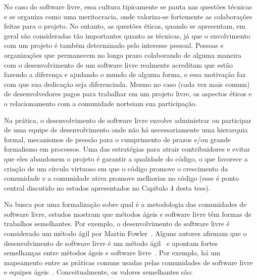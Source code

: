 No caso do software livre, essa cultura tipicamente se pauta nas
questões técnicas e se organiza como uma meritocracia, onde
valoriza-se fortemente as colaborações feitas para o projeto.
%
No entanto, as questões éticas, quando se apresentam, em geral são consideradas
tão importantes quanto as técnicas, já que o envolvimento com um projeto é
também determinado pelo interesse pessoal.
%
Pessoas e organizações que permanecem no longo prazo colaborando de alguma maneira com o
desenvolvimento de um software livre realmente acreditam que estão fazendo a 
diferença e ajudando o mundo de alguma forma, e essa motivação
faz com que sua dedicação seja diferenciada.
%
Mesmo no caso (cada vez mais comum) de desenvolvedores pagos para trabalhar em um projeto
livre, os aspectos éticos e o relacionamento com a comunidade
norteiam sua participação.

\begin{comment}
Acho que voce deveria incluir exemplos ilustrativos para todos os pontos que argumenta (e.g., "Pessoas e organizações que permanecem no longo prazo colaborando de alguma maneira com o desenvolvimento de um software livre realmente acreditam que estão fazendo a diferença e ajudando
o mundo de alguma forma"; "colaboram com um software livre para melhor reaproveitar o conhecimento produzido coletivamente, bem como atingir numa escala maior seu mercado consumidor"; "muitos projetos de software livre não vão além dos estágios iniciais de planejamento"; etc. etc.).
\end{comment}

Na prática, o desenvolvimento de software livre envolve administrar ou participar
de uma equipe de desenvolvimento onde não há necessariamente uma hierarquia formal,
mecanismos de pressão para o cumprimento de prazos e/ou grande formalismo em processos.
%
Uma das estratégias para atrair contribuidores e evitar que eles abandonem o
projeto é garantir a qualidade do código,
o que favorece a criação de um círculo virtuoso em que o código promove o crescimento
da comunidade e a comunidade ativa promove melhorias no código (esse é ponto central
discutido no estudos apresentados no Capítulo 4 desta tese).

Na busca por uma formalização sobre qual é a metodologia das comunidades de software
livre, estudos mostram que métodos ágeis e software livre têm formas de trabalhos
semelhantes. Por exemplo, o desenvolvimento de software livre é considerado um método ágil
por Martin Fowler~\citep{Fowler00orig}.
%
Alguns autores afirmam que o desenvolvimento de software livre é um método
ágil~\citep{Warsta2002} e apontam fortes semelhanças entre métodos ágeis e
software livre~\citep{Warsta2003}.
%
Por exemplo, há um mapeamento entre as práticas comuns usadas pelas
comunidades de software livre e equipes ágeis~\citep{corbucci:2011}.
%
Conceitualmente, os valores semelhantes são:

